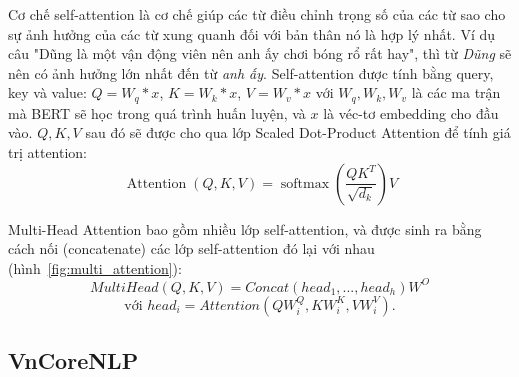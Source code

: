Cơ chế self-attention là cơ chế giúp các từ điều chỉnh trọng số của các từ sao
cho sự ảnh hưởng của các từ xung quanh đối với bản thân nó là hợp lý nhất. Ví
dụ câu "Dũng là một vận động viên nên anh ấy chơi bóng rổ rất hay", thì từ
\textit{Dũng} sẽ nên có ảnh hưởng lớn nhất đến từ \textit{anh ấy}.
Self-attention được tính bằng query, key và value: $Q = W_q * x$, $K = W_k *
x$, $V = W_v * x$ với $W_q, W_k, W_v$ là các ma trận mà BERT sẽ học trong quá
trình huấn luyện, và $x$ là véc-tơ embedding cho đầu vào. $Q, K, V$ sau đó sẽ
được cho qua lớp Scaled Dot-Product Attention để tính giá trị attention:
\[ \operatorname{Attention}(Q, K, V)=\operatorname{softmax}\left(\frac{Q
K^{T}}{\sqrt{d_{k}}}\right) V \]

Multi-Head Attention bao gồm nhiều lớp self-attention, và được sinh ra bằng
cách nối (concatenate) các lớp self-attention đó lại với nhau
(hình~\ref{fig:multi_attention}):
\[ MultiHead(Q,K,V) = Concat(head_1,...,head_h)W^O \]
\[ \text{với } head_i = Attention(QW_i^Q, KW_i^K, VW_i^V). \]


\subsection{VnCoreNLP}
